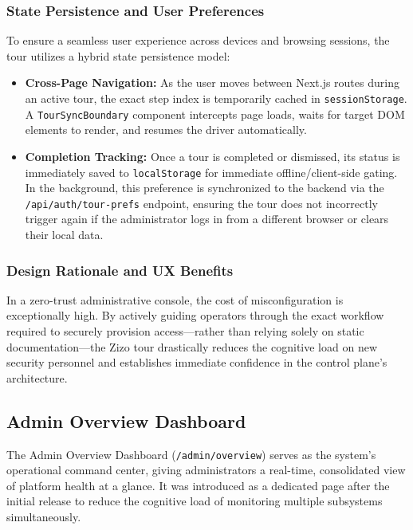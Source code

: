 \subsubsection{State Persistence and User Preferences}
To ensure a seamless user experience across devices and browsing sessions, the tour utilizes a hybrid state persistence model:
\begin{itemize}
    \item \textbf{Cross-Page Navigation:} As the user moves between Next.js routes during an active tour, the exact step index is temporarily cached in \texttt{sessionStorage}. A \texttt{TourSyncBoundary} component intercepts page loads, waits for target DOM elements to render, and resumes the driver automatically.
    \item \textbf{Completion Tracking:} Once a tour is completed or dismissed, its status is immediately saved to \texttt{localStorage} for immediate offline/client-side gating. In the background, this preference is synchronized to the backend via the \texttt{/api/auth/tour-prefs} endpoint, ensuring the tour does not incorrectly trigger again if the administrator logs in from a different browser or clears their local data.
\end{itemize}

\subsubsection{Design Rationale and UX Benefits}
In a zero-trust administrative console, the cost of misconfiguration is exceptionally high. By actively guiding operators through the exact workflow required to securely provision access---rather than relying solely on static documentation---the Zizo tour drastically reduces the cognitive load on new security personnel and establishes immediate confidence in the control plane's architecture.



\subsection{Admin Overview Dashboard}

The Admin Overview Dashboard (\texttt{/admin/overview}) serves as the system's operational command center, giving administrators a real-time, consolidated view of platform health at a glance. It was introduced as a dedicated page after the initial release to reduce the cognitive load of monitoring multiple subsystems simultaneously.

